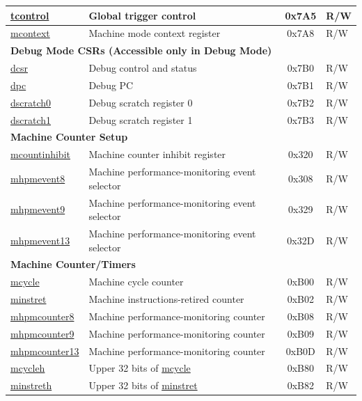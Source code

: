 \begin{longtable}{ | p{4.0cm} | p{8.4cm} | c | l | }
\hyperref[regdesc:TCONTROL]{tcontrol} & Global trigger control & 0x7A5 & R/W \\\hline
\hyperref[regdesc:MCONTEXT]{mcontext} & Machine mode context register & 0x7A8 & R/W \\\hline
\multicolumn{4}{|l|}{\textbf{Debug Mode CSRs (Accessible only in Debug Mode)}} \\\hline
\hyperref[regdesc:DCSR]{dcsr} & Debug control and status  & 0x7B0 & R/W \\\hline
\hyperref[regdesc:DPC]{dpc} & Debug PC & 0x7B1 & R/W \\\hline
\hyperref[regdesc:DSCRATCH0]{dscratch0} & Debug scratch register 0 & 0x7B2 & R/W \\\hline
\hyperref[regdesc:DSCRATCH1]{dscratch1} & Debug scratch register 1 & 0x7B3 & R/W \\\hline
\multicolumn{4}{|l|}{\textbf{Machine Counter Setup }} \\\hline
\hyperref[regdesc:MCOUNTINHIBIT]{mcountinhibit} & Machine counter inhibit register & 0x320 & R/W \\\hline
\hyperref[regdesc:MHPMEVENT8]{mhpmevent8} & Machine performance-monitoring event selector & 0x308 & R/W \\\hline
\hyperref[regdesc:MHPMEVENT9]{mhpmevent9} & Machine performance-monitoring event selector & 0x329& R/W \\\hline
\hyperref[regdesc:MHPMEVENT13]{mhpmevent13} & Machine performance-monitoring event selector & 0x32D & R/W \\\hline
\multicolumn{4}{|l|}{\textbf{Machine Counter/Timers}} \\\hline
\hyperref[regdesc:MCYCLE]{mcycle} & Machine cycle counter & 0xB00 & R/W \\\hline
\hyperref[regdesc:MINSTRET]{minstret} & Machine instructions-retired counter & 0xB02 & R/W \\\hline
\hyperref[regdesc:MHPMCOUNTER8]{mhpmcounter8} & Machine performance-monitoring counter & 0xB08 & R/W \\\hline
\hyperref[regdesc:MHPMCOUNTER9]{mhpmcounter9} & Machine performance-monitoring counter & 0xB09 & R/W \\\hline
\hyperref[regdesc:MHPMCOUNTER13]{mhpmcounter13} & Machine performance-monitoring counter & 0xB0D & R/W \\\hline
\hyperref[regdesc:MCYCLEH]{mcycleh} & Upper 32 bits of \hyperref[regdesc:MCYCLE]{mcycle} & 0xB80 & R/W \\\hline
\hyperref[regdesc:MINSTRETH]{minstreth} & Upper 32 bits of \hyperref[regdesc:MINSTRET]{minstret}  & 0xB82 & R/W \\\hline

\end{longtable}
